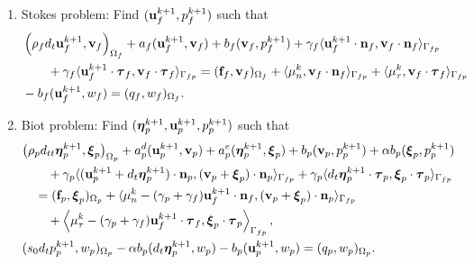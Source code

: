 \documentclass[11pt]{article}
\def\u{{\bf u}}
\def\bv{{\bf v}}
\def\n{{\bf n}}
\def\f{{\bf f}}
\def\btau{\boldsymbol{\tau}}
\def\bbeta{\boldsymbol{\eta}}
\def\bxi{\boldsymbol{\xi}}
\def\O{\Omega}
\def\<{\langle}
\def\>{\rangle}
\def\dt{d_t}
\def\dtt{d_{tt}}
\begin{document}
\begin{enumerate}
\item Stokes problem: Find $(\u_f^{k+1}, p_f^{k+1})$ such that
%
\begin{align}
  & \left(\rho_f {\dt\u_{f}^{k+1}},\bv_{f}\right)_{\O_f}+ a_{f}(\u_{f}^{k+1},\bv_{f}) + b_f(\bv_{f},p_{f}^{k+1}) + \gamma_f\<\u_f^{k+1}\cdot\n_f,\bv_f\cdot\n_f\>_{\Gamma_{fp}}
  \nonumber \\
  & \qquad  +  \gamma_f \< \u_f^{k+1}\cdot\btau_{f},\bv_f\cdot\btau_{f}\>_{\Gamma_{fp}} = (\f_{f},\bv_{f})_{\O_f} + \<\mu_n^k,\bv_f\cdot\n_{f}\>_{\Gamma_{fp}}  + \< \mu_{\tau}^k,\bv_f\cdot\btau_{f}\>_{\Gamma_{fp}}  \label{stokes-weak-1_iter}\\
 & - b_f(\u^{k+1}_{f},w_{f}) = (q_{f},w_{f})_{\O_f}. \label{stokes-weak-2_iter}
\end{align}
%

\item Biot problem: Find $(\bbeta^{k+1}_p, \u_p^{k+1}, p_p^{k+1})$ such that
%
\begin{align}
 &\big(\rho_p\dtt \bbeta_{p}^{k+1},\bxi_{p}\big)_{\O_p}+ a^d_{p}(\u_{p}^{k+1},\bv_{p}) + a^e_{p}(\bbeta_{p}^{k+1},\bxi_{p}) + b_p(\bv_{p},p_{p}^{k+1}) +
  \alpha b_p(\bxi_{p},p_{p}^{k+1}) \nonumber \\
  & \qquad  + \gamma_p\<(\u_p^{k+1} + \dt\bbeta_p^{k+1})\cdot\n_p,
        (\bv_p + \bxi_p)\cdot\n_p\>_{\Gamma_{fp}}
  + \gamma_p\<\dt\bbeta_p^{k+1}\cdot\btau_p,\bxi_p\cdot\btau_p\>_{\Gamma_{fp}}
  \nonumber \\
  & \quad = (\f_{p},\bxi_{p})_{\O_p}
  + \<\mu_n^k - (\gamma_p + \gamma_f)\u_f^{k+1}\cdot\n_f,
  (\bv_p + \bxi_p)\cdot\n_p\>_{\Gamma_{fp}} \nonumber \\
  & \qquad
  + \left\<\mu_{\tau}^k
- (\gamma_p + \gamma_f) \u_f^{k+1}\cdot\btau_f,
\bxi_p\cdot\btau_p\right\>_{\Gamma_{fp}}, \label{biot-weak-1_iter} \\
& ( s_0 \dt p_{p}^{k+1},w_{p})_{\O_p} - \alpha b_p(\dt\bbeta_{p}^{k+1},w_{p}) - b_p(\u_{p}^{k+1},w_{p}) = (q_{p},w_{p})_{\O_p}. \label{biot-weak-2_iter}
\end{align}
%


\end{enumerate}
\end{document}
